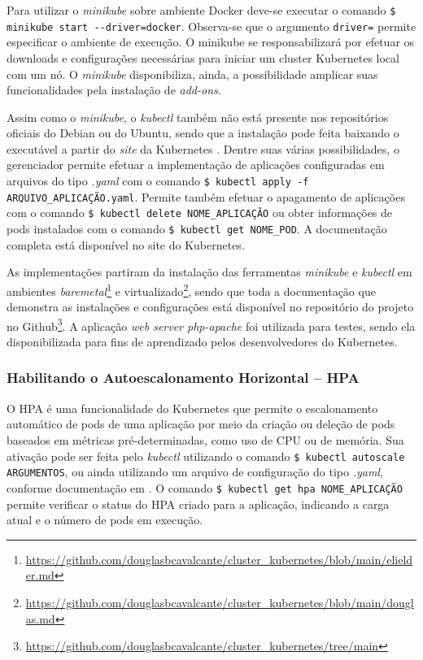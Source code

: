 \documentclass[12pt]{article}
\begin{document}
Para utilizar o \textit{minikube} sobre ambiente Docker deve-se executar o comando \verb|$ minikube start --driver=docker|. Observa-se que o argumento \verb|driver=| permite especificar o ambiente de execução. O minikube se responsabilizará por efetuar os downloads e configurações necessárias para iniciar um cluster Kubernetes local com um nó. O \textit{minikube} disponibiliza, ainda, a possibilidade amplicar suas funcionalidades pela instalação de \textit{add-ons}.

Assim como o \textit{minikube}, o \textit{kubectl} também não está presente nos repositórios oficiais do Debian ou do Ubuntu, sendo que a instalação pode feita baixando o executável a partir do \textit{site} da Kubernetes \cite{InstallSetKubectl_2024}. Dentre suas várias possibilidades, o gerenciador permite efetuar a implementação de aplicações configuradas em arquivos do tipo \textit{.yaml} com o comando \verb|$ kubectl apply -f ARQUIVO_APLICAÇÃO.yaml|. Permite também efetuar o apagamento de aplicações com o comando \verb|$ kubectl delete NOME_APLICAÇÃO| ou obter informações de pods instalados com o comando \verb|$ kubectl get NOME_POD|. A documentação completa está disponível no site do Kubernetes.

As implementações partiram da instalação das ferramentas \textit{minikube} e \textit{kubectl} em ambientes \textit{baremetal}\footnote{\href{https://github.com/douglasbcavalcante/cluster\_kubernetes/blob/main/elielder.md}{https://github.com/douglasbcavalcante/cluster\_kubernetes/blob/main/elielder.md}} e  virtualizado\footnote{\href{https://github.com/douglasbcavalcante/cluster\_kubernetes/blob/main/douglas.md}{https://github.com/douglasbcavalcante/cluster\_kubernetes/blob/main/douglas.md}}, sendo que toda a documentação que demonstra as instalações e configurações está disponível no repositório do projeto no Github\footnote{\href{https://github.com/douglasbcavalcante/cluster\_kubernetes/tree/main}{https://github.com/douglasbcavalcante/cluster\_kubernetes/tree/main}}. A aplicação \textit{web server php-apache} foi utilizada para testes, sendo ela disponibilizada para fins de aprendizado pelos desenvolvedores do Kubernetes.

\subsubsection{Habilitando o Autoescalonamento Horizontal -- HPA}\label{subsec:hpa}

O HPA é uma funcionalidade do Kubernetes que permite o escalonamento automático de pods de uma aplicação por meio da criação ou deleção de pods baseados em métricas pré-determinadas, como uso de CPU ou de memória. Sua ativação pode ser feita pelo \textit{kubectl} utilizando o comando \verb|$ kubectl autoscale ARGUMENTOS|, ou ainda utilizando um arquivo de configuração do tipo \textit{.yaml}, conforme documentação em \cite{kubernetes_horizontalpodautoscaler_nodate}. O comando \verb|$ kubectl get hpa NOME_APLICAÇÃO| permite verificar o status do HPA criado para a aplicação, indicando a carga atual e o número de pods em execução.
\end{document}
